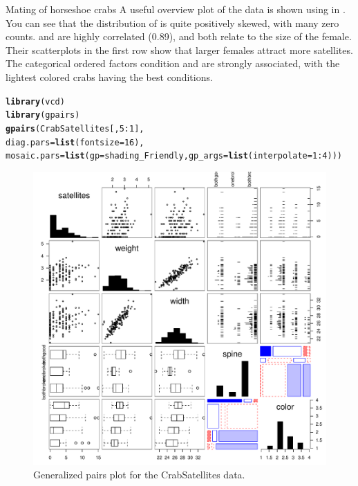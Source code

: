 \documentclass[11pt]{book}\usepackage[]{graphicx}\usepackage[]{color}
\makeatletter
\newcommand{\hlnum}[1]{\textcolor[rgb]{0.686,0.059,0.569}{#1}}%
\newcommand{\hlopt}[1]{\textcolor[rgb]{0,0,0}{#1}}%
\newcommand{\hlstd}[1]{\textcolor[rgb]{0.345,0.345,0.345}{#1}}%
\newcommand{\hlkwc}[1]{\textcolor[rgb]{0.333,0.667,0.333}{#1}}%
\newcommand{\hlkwd}[1]{\textcolor[rgb]{0.737,0.353,0.396}{\textbf{#1}}}%
\newenvironment{kframe}{%
 \def\at@end@of@kframe{}%
 \ifinner\ifhmode%
  \def\at@end@of@kframe{\end{minipage}}%
  \begin{minipage}{\columnwidth}%
 \fi\fi%
 \def\FrameCommand##1{\hskip\@totalleftmargin \hskip-\fboxsep
 \colorbox{shadecolor}{##1}\hskip-\fboxsep
     \hskip-\linewidth \hskip-\@totalleftmargin \hskip\columnwidth}%
 \MakeFramed {\advance\hsize-\width
   \@totalleftmargin\z@ \linewidth\hsize
   \@setminipage}}%
 {\par\unskip\endMakeFramed%
 \at@end@of@kframe}
\newenvironment{knitrout}{}{} %
\renewenvironment{knitrout}{\small\renewcommand{\baselinestretch}{.85}}{} %
\makeatother
\begin{document}
\begin{Example}[crabs1]{Mating of horseshoe crabs}
A useful overview plot of the data is shown using  in .
You can see that the distribution of  is quite positively skewed,
with many zero counts.   and  are highly correlated (0.89),
and both relate to the size of the female.
Their scatterplots in the first row show that larger females attract more satellites.
The categorical ordered factors  condition and  are strongly
associated, with the lightest colored crabs having the best conditions.
\begin{knitrout}
\color{fgcolor}\begin{kframe}
\begin{alltt}
\hlkwd{library}\hlstd{(vcd)}
\hlkwd{library}\hlstd{(gpairs)}
\hlkwd{gpairs}\hlstd{(CrabSatellites[,}\hlnum{5}\hlopt{:}\hlnum{1}\hlstd{],}
       \hlkwc{diag.pars} \hlstd{=} \hlkwd{list}\hlstd{(}\hlkwc{fontsize}\hlstd{=}\hlnum{16}\hlstd{),}
       \hlkwc{mosaic.pars} \hlstd{=} \hlkwd{list}\hlstd{(}\hlkwc{gp}\hlstd{=shading_Friendly,} \hlkwc{gp_args}\hlstd{=}\hlkwd{list}\hlstd{(}\hlkwc{interpolate}\hlstd{=}\hlnum{1}\hlopt{:}\hlnum{4}\hlstd{)))}
\end{alltt}
\end{kframe}\begin{figure}[!htbp]


\centerline{\includegraphics[width=.8\textwidth]{ch09/fig/crabs1-gpairs-1} }

\caption[Generalized pairs plot for the CrabSatellites data]{Generalized pairs plot for the CrabSatellites data.\label{fig:crabs1-gpairs}}
\end{figure}



\end{knitrout}
\end{Example}
\end{document}
